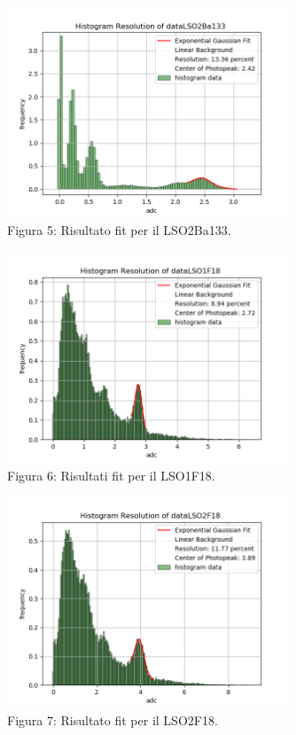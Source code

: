 \documentclass[a4paper]{article}
\begin{document}
\begin{figure}[H]
\centering
\includegraphics[width=0.75\textwidth]{histdataLSO2Ba133}
\caption{Figura 5: Risultato fit per il LSO2Ba133.}
\end{figure}
\begin{figure}[H]
\centering
\includegraphics[width=0.75\textwidth]{histdataLSO1F18}
\caption{Figura 6: Risultati fit per il LSO1F18.}
\end{figure}
\begin{figure}[H]
\centering
\includegraphics[width=0.75\textwidth]{histdataLSO2F18}
\caption{Figura 7: Risultato fit per il LSO2F18.}
\end{figure}
\end{document}
